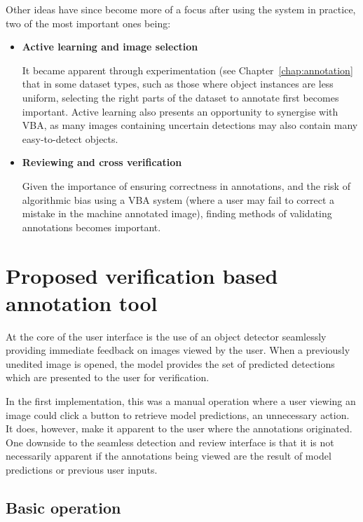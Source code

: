 Other ideas have since become more of a focus after using the system in practice, two of the most important ones being:

\begin{itemize}

\item {\bf Active learning and image selection} \par

It became apparent through experimentation (see Chapter~\ref{chap:annotation} that in some dataset types, such as those where object instances are less uniform, selecting the right parts of the dataset to annotate first becomes important. Active learning also presents an opportunity to synergise with \gls{VBA}, as many images containing uncertain detections may also contain many easy-to-detect objects.

\item {\bf Reviewing and cross verification} \par

Given the importance of ensuring correctness in annotations, and the risk of algorithmic bias using a \gls{VBA} system (where a user may fail to correct a mistake in the machine annotated image), finding methods of validating annotations becomes important. 

\end{itemize}


\section {Proposed verification based annotation tool}

At the core of the user interface is the use of an object detector seamlessly providing immediate feedback on images viewed by the user. When a previously unedited image is opened, the model provides the set of predicted detections which are presented to the user for verification. 

In the first implementation, this was a manual operation where a user viewing an image could click a button to retrieve model predictions, an unnecessary action. It does, however, make it apparent to the user where the annotations originated. One downside to the seamless detection and review interface is that it is not necessarily apparent if the annotations being viewed are the result of model predictions or previous user inputs.

\subsection{Basic operation}


